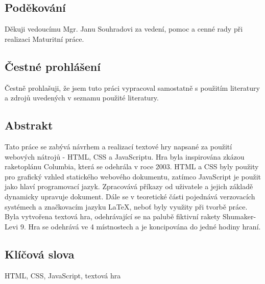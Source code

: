 \documentclass[main.tex]{subfiles}
\begin{document}
\subsection*{Poděkování}
Děkuji vedoucímu Mgr. Janu Souhradovi za vedení, pomoc a cenné rady při realizaci Maturitní práce. 

\subsection*{Čestné prohlášení}
Čestně prohlašuji, že jsem tuto práci vypracoval samostatně s použitím literatury a zdrojů uvedených v seznamu použité literatury.

\subsection*{Abstrakt}
Tato práce se zabývá návrhem a realizací textové hry napsané za použití webových nátrojů - HTML, CSS a JavaScriptu. Hra byla inspirována zkázou raketoplánu Columbia, která se odehrála v roce 2003. HTML a CSS byly použity pro grafický vzhled statického webového dokumentu, zatímco JavaScript je použit jako hlaví programovací jazyk. Zpracovává příkazy od uživatele a jejich základě dynamicky upravuje dokument. Dále se v teoretické části pojednává verzovacích systémech a značkovacím jazyku \LaTeX, neboť byly využity při tvorbě práce.
Byla vytvořena textová hra, odehrávající se na palubě fiktivní rakety Shumaker-Levi 9. Hra se odehrává ve 4 místnostech a je koncipována do jedné hodiny hraní. 

\subsection*{Klíčová slova}
HTML, CSS, JavaScript, textová hra
\end{document}
